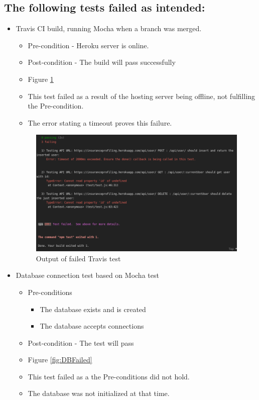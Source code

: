 \documentclass{article}
\begin{document}
\subsection{The following tests failed as intended:}
\begin{itemize}
	\item Travis CI build, running Mocha when a branch was merged.
	\begin{itemize}
	\item Pre-condition - Heroku server is online.
	\item Post-condition - The build will pass successfully 
	\item Figure \ref{fig:failed}
	\item This test failed as a result of the hosting server being offline, not fulfilling the Pre-condition. 
	\item The error stating a timeout proves this failure.
	\end{itemize}

	\begin{figure}[h]
  	\centering
      \includegraphics[width=\textwidth]{images/failed.png}
  	\caption{Output of failed Travis test}
  	\label{fig:failed}
	\end{figure}	
	
	\cleardoublepage
	\item Database connection test based on Mocha test
	\begin{itemize}
	\item Pre-conditions
	\begin{itemize}
		\item The database exists and is created
		\item The database accepts connections
	\end{itemize}
	\item Post-condition - The test will pass
	\item Figure \ref{fig:DBFailed}
	\item This test failed as a the Pre-conditions did not hold. 
	\item The database was not initialized at that time.
	\end{itemize}



\end{itemize}
\end{document}
